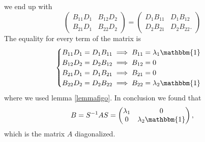 \documentclass[12pt]{book}
\theoremstyle{plain}
\newcommand{\I}{\mathbbm{1}}
\theoremstyle{definition}
\theoremstyle{remark}
\begin{document}
we end up with
\[\begin{pmatrix}
B_{11}D_1&B_{12}D_2\\
B_{21}D_1&B_{22}D_2
\end{pmatrix} = \begin{pmatrix}
D_1B_{11}&D_1B_{12}\\
D_2B_{21}&D_2B_{22}.
\end{pmatrix}\]
The equality for every term of the matrix is
\[\begin{cases}
B_{11}D_1 = D_1 B_{11} \implies B_{11} = \lambda_1 \I \\
B_{12}D_2 = D_2 B_{12} \implies B_{12} = 0\\
B_{21}D_1 = D_1 B_{21} \implies B_{21} = 0\\
B_{22}D_2 = D_2 B_{22} \implies B_{22} = \lambda_2 \I 
\end{cases}\]
where we used lemma \ref{lemmafigo}. In conclusion we found that
\[B = S^{-1}AS = \begin{pmatrix}
\lambda_1 &0\\
0&\lambda_2\I
\end{pmatrix},\]
which is the matrix $A$ diagonalized.
\end{document}
